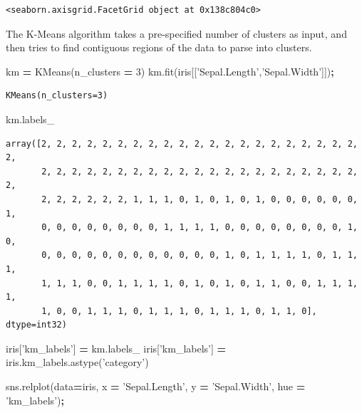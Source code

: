 \documentclass[
  letterpaper,
]{scrbook}
\newenvironment{Shaded}{\begin{snugshade}}{\end{snugshade}}
\newcommand{\DecValTok}[1]{\textcolor[rgb]{0.00,0.00,0.81}{#1}}
\newcommand{\NormalTok}[1]{#1}
\newcommand{\OperatorTok}[1]{\textcolor[rgb]{0.81,0.36,0.00}{\textbf{#1}}}
\newcommand{\StringTok}[1]{\textcolor[rgb]{0.31,0.60,0.02}{#1}}
\begin{document}
\begin{verbatim}
<seaborn.axisgrid.FacetGrid object at 0x138c804c0>
\end{verbatim}

The K-Means algorithm takes a pre-specified number of clusters as input, and then tries to find contiguous regions of the data to parse into clusters.

\begin{Shaded}
\begin{Highlighting}[]
\NormalTok{km }\OperatorTok{=}\NormalTok{ KMeans(n_clusters }\OperatorTok{=} \DecValTok{3}\NormalTok{)}
\NormalTok{km.fit(iris[[}\StringTok{'Sepal.Length'}\NormalTok{,}\StringTok{'Sepal.Width'}\NormalTok{]])}\OperatorTok{;}
\end{Highlighting}
\end{Shaded}

\begin{verbatim}
KMeans(n_clusters=3)
\end{verbatim}

\begin{Shaded}
\begin{Highlighting}[]
\NormalTok{km.labels_}
\end{Highlighting}
\end{Shaded}

\begin{verbatim}
array([2, 2, 2, 2, 2, 2, 2, 2, 2, 2, 2, 2, 2, 2, 2, 2, 2, 2, 2, 2, 2, 2,
       2, 2, 2, 2, 2, 2, 2, 2, 2, 2, 2, 2, 2, 2, 2, 2, 2, 2, 2, 2, 2, 2,
       2, 2, 2, 2, 2, 2, 1, 1, 1, 0, 1, 0, 1, 0, 1, 0, 0, 0, 0, 0, 0, 1,
       0, 0, 0, 0, 0, 0, 0, 0, 1, 1, 1, 1, 0, 0, 0, 0, 0, 0, 0, 0, 1, 0,
       0, 0, 0, 0, 0, 0, 0, 0, 0, 0, 0, 0, 1, 0, 1, 1, 1, 1, 0, 1, 1, 1,
       1, 1, 1, 0, 0, 1, 1, 1, 1, 0, 1, 0, 1, 0, 1, 1, 0, 0, 1, 1, 1, 1,
       1, 0, 0, 1, 1, 1, 0, 1, 1, 1, 0, 1, 1, 1, 0, 1, 1, 0], dtype=int32)
\end{verbatim}

\begin{Shaded}
\begin{Highlighting}[]
\NormalTok{iris[}\StringTok{'km_labels'}\NormalTok{] }\OperatorTok{=}\NormalTok{ km.labels_}
\NormalTok{iris[}\StringTok{'km_labels'}\NormalTok{] }\OperatorTok{=}\NormalTok{ iris.km_labels.astype(}\StringTok{'category'}\NormalTok{)}

\NormalTok{sns.relplot(data}\OperatorTok{=}\NormalTok{iris, x }\OperatorTok{=} \StringTok{'Sepal.Length'}\NormalTok{, y }\OperatorTok{=} \StringTok{'Sepal.Width'}\NormalTok{, }
\NormalTok{           hue }\OperatorTok{=} \StringTok{'km_labels'}\NormalTok{)}\OperatorTok{;}
\end{Highlighting}
\end{Shaded}
\end{document}
